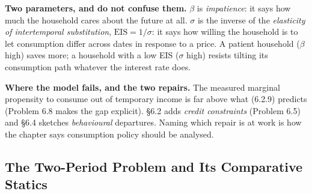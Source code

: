 \documentclass[12pt, letterpaper]{article}
\begin{document}
\begin{tcolorbox}[theorybox,title={Chapter 6 Overview}]
\smallskip
\textbf{Two parameters, and do not confuse them.} $\beta$ is \emph{impatience}: it says how
much the household cares about the future at all. $\sigma$ is the inverse of the
\emph{elasticity of intertemporal substitution}, $\mathrm{EIS}=1/\sigma$: it says how
willing the household is to let consumption differ across dates in response to a price. A
patient household ($\beta$ high) saves more; a household with a low EIS ($\sigma$ high)
resists tilting its consumption path whatever the interest rate does.

\smallskip
\textbf{Where the model fails, and the two repairs.} The measured marginal propensity to
consume out of temporary income is far above what (6.2.9) predicts (Problem 6.8 makes the
gap explicit). \S6.2 adds \emph{credit constraints} (Problem 6.5) and \S6.4 sketches
\emph{behavioural} departures. Naming which repair is at work is how the chapter says
consumption policy should be analysed.
\end{tcolorbox}

\subsection{The Two-Period Problem and Its Comparative Statics}
\end{document}
